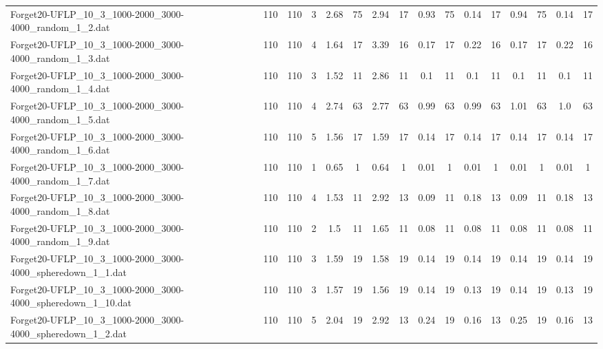 \begin{sidewaystable}[!ht]
{\begin{tabular}{lccccccccccccccc}
Forget20-UFLP\_10\_3\_1000-2000\_3000-4000\_random\_1\_2.dat & 110 & 110 & 3 & 2.68 & 75 & 2.94 & 17 & 0.93 & 75 &  \textcolor{blue2}{0.14} & 17 & 0.94 & 75 &  \textcolor{blue2}{0.14} & 17 \\
Forget20-UFLP\_10\_3\_1000-2000\_3000-4000\_random\_1\_3.dat & 110 & 110 & 4 & 1.64 & 17 & 3.39 & 16 &  \textcolor{blue2}{0.17} & 17 & 0.22 & 16 &  \textcolor{blue2}{0.17} & 17 & 0.22 & 16 \\
Forget20-UFLP\_10\_3\_1000-2000\_3000-4000\_random\_1\_4.dat & 110 & 110 & 3 & 1.52 & 11 & 2.86 & 11 & 0.1 & 11 & 0.1 & 11 & 0.1 & 11 & 0.1 & 11 \\
Forget20-UFLP\_10\_3\_1000-2000\_3000-4000\_random\_1\_5.dat & 110 & 110 & 4 & 2.74 & 63 & 2.77 & 63 & 0.99 & 63 & 0.99 & 63 & 1.01 & 63 & 1.0 & 63 \\
Forget20-UFLP\_10\_3\_1000-2000\_3000-4000\_random\_1\_6.dat & 110 & 110 & 5 & 1.56 & 17 & 1.59 & 17 &  \textcolor{blue2}{0.14} & 17 &  \textcolor{blue2}{0.14} & 17 &  \textcolor{blue2}{0.14} & 17 &  \textcolor{blue2}{0.14} & 17 \\
Forget20-UFLP\_10\_3\_1000-2000\_3000-4000\_random\_1\_7.dat & 110 & 110 & 1 & 0.65 & 1 & 0.64 & 1 &  \textcolor{blue2}{0.01} & 1 &  \textcolor{blue2}{0.01} & 1 &  \textcolor{blue2}{0.01} & 1 &  \textcolor{blue2}{0.01} & 1 \\
Forget20-UFLP\_10\_3\_1000-2000\_3000-4000\_random\_1\_8.dat & 110 & 110 & 4 & 1.53 & 11 & 2.92 & 13 &  \textcolor{blue2}{0.09} & 11 & 0.18 & 13 &  \textcolor{blue2}{0.09} & 11 & 0.18 & 13 \\
Forget20-UFLP\_10\_3\_1000-2000\_3000-4000\_random\_1\_9.dat & 110 & 110 & 2 & 1.5 & 11 & 1.65 & 11 &  \textcolor{blue2}{0.08} & 11 &  \textcolor{blue2}{0.08} & 11 &  \textcolor{blue2}{0.08} & 11 &  \textcolor{blue2}{0.08} & 11 \\
Forget20-UFLP\_10\_3\_1000-2000\_3000-4000\_spheredown\_1\_1.dat & 110 & 110 & 3 & 1.59 & 19 & 1.58 & 19 &  \textcolor{blue2}{0.14} & 19 &  \textcolor{blue2}{0.14} & 19 &  \textcolor{blue2}{0.14} & 19 &  \textcolor{blue2}{0.14} & 19 \\
Forget20-UFLP\_10\_3\_1000-2000\_3000-4000\_spheredown\_1\_10.dat & 110 & 110 & 3 & 1.57 & 19 & 1.56 & 19 & 0.14 & 19 &  \textcolor{blue2}{0.13} & 19 & 0.14 & 19 &  \textcolor{blue2}{0.13} & 19 \\
Forget20-UFLP\_10\_3\_1000-2000\_3000-4000\_spheredown\_1\_2.dat & 110 & 110 & 5 & 2.04 & 19 & 2.92 & 13 & 0.24 & 19 &  \textcolor{blue2}{0.16} & 13 & 0.25 & 19 &  \textcolor{blue2}{0.16} & 13 \\

\end{tabular}}
\end{sidewaystable}
